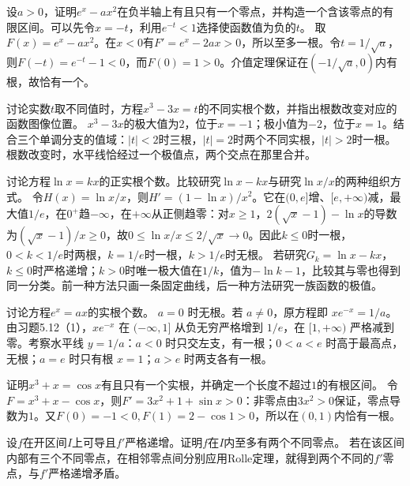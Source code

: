 设\(a>0\)，证明\(e^x-ax^2\)在负半轴上有且只有一个零点，并构造一个含该零点的有限区间。可以先令\(x=-t\)，利用\(e^{-t}<1\)选择使函数值为负的\(t\)。
\solutionanswer
取\(F(x)=e^x-ax^2\)。在\(x<0\)有\(F'=e^x-2ax>0\)，所以至多一根。令\(t=1/\sqrt a\)，则\(F(-t)=e^{-t}-1<0\)，而\(F(0)=1>0\)。介值定理保证在\((-1/\sqrt a,0)\)内有根，故恰有一个。


讨论实数\(t\)取不同值时，方程\(x^3-3x=t\)的不同实根个数，并指出根数改变对应的函数图像位置。
\solutionanswer
\(x^3-3x\)的极大值为\(2\)，位于\(x=-1\)；极小值为\(-2\)，位于\(x=1\)。结合三个单调分支的值域：\(|t|<2\)时三根，\(|t|=2\)时两个不同实根，\(|t|>2\)时一根。根数改变时，水平线恰经过一个极值点，两个交点在那里合并。


讨论方程\(\ln x=kx\)的正实根个数。比较研究\(\ln x-kx\)与研究\(\ln x/x\)的两种组织方式。
\solutionanswer
令\(H(x)=\ln x/x\)，则\(H'=(1-\ln x)/x^2\)。它在\((0,e]\)增、\([e,+\infty)\)减，最大值\(1/e\)，在\(0^+\)趋\(-\infty\)，在\(+\infty\)从正侧趋零：对\(x\ge1\)，\(2(\sqrt x-1)-\ln x\)的导数为\((\sqrt x-1)/x\ge0\)，故\(0\le\ln x/x\le2/\sqrt x\to0\)。因此\(k\le0\)时一根，\(0<k<1/e\)时两根，\(k=1/e\)时一根，\(k>1/e\)时无根。
若研究\(G_k=\ln x-kx\)，\(k\le0\)时严格递增；\(k>0\)时唯一极大值在\(1/k\)，值为\(-\ln k-1\)，比较其与零也得到同一分类。前一种方法只画一条固定曲线，后一种方法研究一族函数的极值。


讨论方程\(e^x=ax\)的实根个数。
\solutionanswer
\(a=0\) 时无根。若 \(a\ne0\)，原方程即 \(xe^{-x}=1/a\)。由习题5.12（1），\(xe^{-x}\) 在 \((-\infty,1]\) 从负无穷严格增到 \(1/e\)，在 \([1,+\infty)\) 严格减到零。考察水平线 \(y=1/a\)：\(a<0\) 时只交左支，有一根；\(0<a<e\) 时高于最高点，无根；\(a=e\) 时只有根 \(x=1\)；\(a>e\) 时两支各有一根。


证明\(x^3+x=\cos x\)有且只有一个实根，并确定一个长度不超过\(1\)的有根区间。
\solutionanswer
令\(F=x^3+x-\cos x\)，则\(F'=3x^2+1+\sin x>0\)：非零点由\(3x^2>0\)保证，零点导数为\(1\)。又\(F(0)=-1<0,F(1)=2-\cos1>0\)，所以在\((0,1)\)内恰有一根。


设\(f\)在开区间\(I\)上可导且\(f'\)严格递增。证明\(f\)在\(I\)内至多有两个不同零点。
\solutionanswer
若在该区间内部有三个不同零点，在相邻零点间分别应用Rolle定理，就得到两个不同的\(f'\)零点，与\(f'\)严格递增矛盾。



